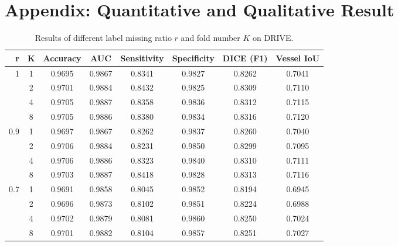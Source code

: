 \documentclass[runningheads]{llncs}
\begin{document}
\section{Appendix: Quantitative and Qualitative Result}
\begin{table}[h]\setlength{\tabcolsep}{6pt}
\setlength{\abovecaptionskip}{0pt}
\centering
\footnotesize
\caption{Results of different label missing ratio $r$ and fold number $K$ on DRIVE. }
\begin{tabular}{|r|c|c|c|c|c|c|c|}
\hline
r& K & Accuracy & AUC & Sensitivity & Specificity &   DICE (F1) &Vessel IoU  \\ \hline\hline

1 &1&0.9695&0.9867&0.8341&0.9827&0.8262&0.7041\\ \hline
&2&0.9701&0.9884&0.8432&0.9825&0.8309&0.7110\\ \hline
&4&0.9705&0.9887&0.8358&0.9836&0.8312&0.7115\\ \hline
&8&0.9705&0.9886&0.8380&0.9834&0.8316&0.7120\\ \hline\hline
0.9&1&0.9697&0.9867&0.8262&0.9837&0.8260&0.7040\\ \hline
&2&0.9706&0.9884&0.8231&0.9850&0.8299&0.7095\\ \hline
&4&0.9706&0.9886&0.8323&0.9840&0.8310&0.7111\\ \hline
&8&0.9703&0.9887&0.8418&0.9828&0.8313&0.7116\\ \hline\hline
0.7&1&0.9691&0.9858&0.8045&0.9852&0.8194&0.6945\\ \hline
&2&0.9696&0.9873&0.8102&0.9851&0.8224&0.6988\\ \hline
&4&0.9702&0.9879&0.8081&0.9860&0.8250&0.7024\\ \hline
&8&0.9701&0.9882&0.8104&0.9857&0.8251&0.7027\\ \hline
\end{tabular}\label{exp:drive_full}
\end{table}
\end{document}
